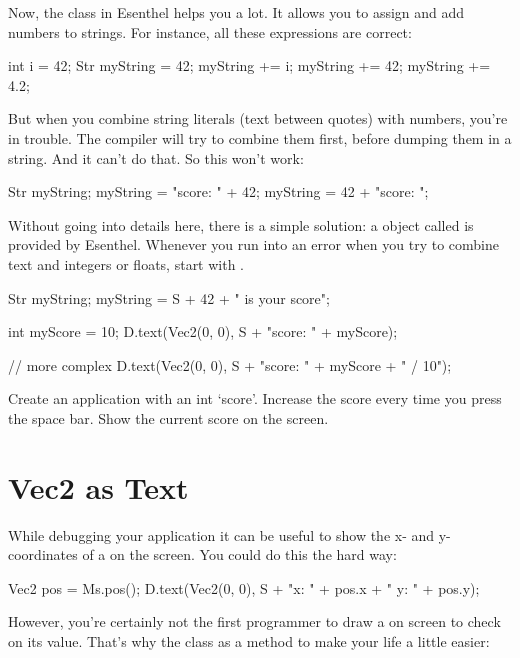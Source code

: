 Now, the  class in Esenthel helps you a lot. It allows you to assign and add numbers to strings. For instance, all these expressions are correct:

\begin{code}
int i = 42;
Str myString =  42;
myString    +=   i; 
myString    +=  42; 
myString    += 4.2; 
\end{code}

But when you combine string literals (text between quotes) with numbers, you're in trouble. The compiler will try to combine them first, before dumping them in a string. And it can't do that. So this won't work:

\begin{code}
Str myString;
myString = "score: " + 42; 
myString = 42 + "score: "; 
\end{code}
 
Without going into details here, there is a simple solution: a  object called  is provided by Esenthel. Whenever you run into an error when you try to combine text and integers or floats, start with .

\begin{code}
Str myString;
myString = S + 42  + " is your score"; 

int myScore = 10;
D.text(Vec2(0, 0), S + "score: " + myScore);

// more complex
D.text(Vec2(0, 0), S + "score: " + myScore + " / 10");
\end{code}

\begin{exercise}
Create an application with an int `score'. Increase the score every time you press the space bar. Show the current score on the screen.
\end{exercise}

\section{Vec2 as Text}
While debugging your application it can be useful to show the x- and y-coordinates of a  on the screen. You could do this the hard way:

\begin{code}
Vec2 pos = Ms.pos();
D.text(Vec2(0, 0), S + "x: " + pos.x + " y: " + pos.y);
\end{code}

However, you're certainly not the first programmer to draw a  on screen to check on its value. That's why the class as a method to make your life a little easier:

